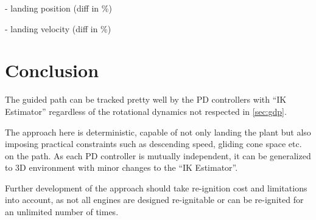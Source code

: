 \documentclass[notitlepage,twocolumn,10pt]{article}
\begin{document}
- landing position (diff in \%)

- landing velocity (diff in \%)

\section{Conclusion}
The guided path can be tracked pretty well by the PD controllers with ``IK Estimator'' regardless of the rotational dynamics not respected in \cref{sec:gdp}.

The approach here is deterministic, capable of not only landing the plant but also imposing practical constraints such as descending speed, gliding cone space etc. on the path. As each PD controller is mutually independent, it can be generalized to 3D environment with minor changes to the ``IK Estimator''. 

Further development of the approach should take re-ignition cost and limitations into account, as not all engines are designed re-ignitable or can be re-ignited for an unlimited number of times\cite{sutton2006history,zhao2016real}.    

\printbibliography
\end{document}
